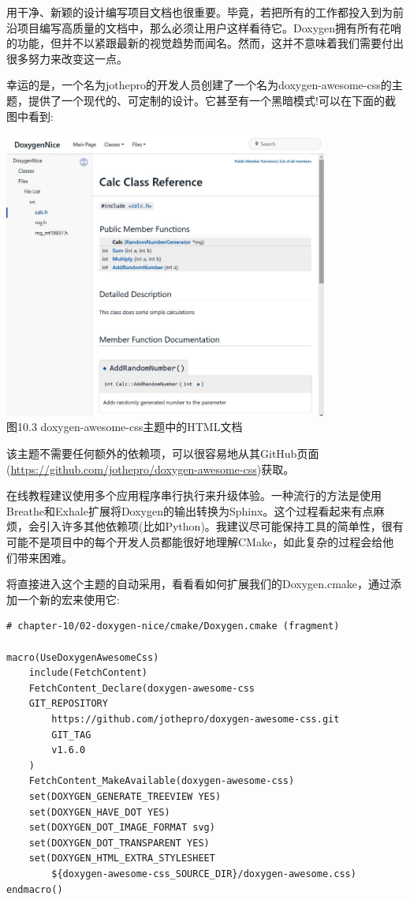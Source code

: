 

用干净、新颖的设计编写项目文档也很重要。毕竟，若把所有的工作都投入到为前沿项目编写高质量的文档中，那么必须让用户这样看待它。Doxygen拥有所有花哨的功能，但并不以紧跟最新的视觉趋势而闻名。然而，这并不意味着我们需要付出很多努力来改变这一点。

幸运的是，一个名为jothepro的开发人员创建了一个名为doxygen-awesome-css的主题，提供了一个现代的、可定制的设计。它甚至有一个黑暗模式!可以在下面的截图中看到:

\begin{center}
\includegraphics[width=0.8\textwidth]{content/3/chapter10/images/3.jpg}\\
图10.3  doxygen-awesome-css主题中的HTML文档
\end{center}

该主题不需要任何额外的依赖项，可以很容易地从其GitHub页面(\url{https://github.com/jothepro/doxygen-awesome-css})获取。

\begin{tcolorbox}[colback=blue!5!white,colframe=blue!75!black,title=Note]
在线教程建议使用多个应用程序串行执行来升级体验。一种流行的方法是使用Breathe和Exhale扩展将Doxygen的输出转换为Sphinx。这个过程看起来有点麻烦，会引入许多其他依赖项(比如Python)。我建议尽可能保持工具的简单性，很有可能不是项目中的每个开发人员都能很好地理解CMake，如此复杂的过程会给他们带来困难。
\end{tcolorbox}

将直接进入这个主题的自动采用，看看看如何扩展我们的Doxygen.cmake，通过添加一个新的宏来使用它:

\begin{lstlisting}[style=styleCMake]
# chapter-10/02-doxygen-nice/cmake/Doxygen.cmake (fragment)

macro(UseDoxygenAwesomeCss)
	include(FetchContent)
	FetchContent_Declare(doxygen-awesome-css
	GIT_REPOSITORY
		https://github.com/jothepro/doxygen-awesome-css.git
		GIT_TAG
		v1.6.0
	)
	FetchContent_MakeAvailable(doxygen-awesome-css)
	set(DOXYGEN_GENERATE_TREEVIEW YES)
	set(DOXYGEN_HAVE_DOT YES)
	set(DOXYGEN_DOT_IMAGE_FORMAT svg)
	set(DOXYGEN_DOT_TRANSPARENT YES)
	set(DOXYGEN_HTML_EXTRA_STYLESHEET
		${doxygen-awesome-css_SOURCE_DIR}/doxygen-awesome.css)
endmacro()
\end{lstlisting}

